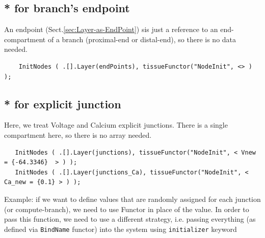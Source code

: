 \subsection{* for branch's endpoint}

An endpoint (Sect.\ref{sec:Layer-as-EndPoint}) sis just a reference to an
end-compartment of a branch (proximal-end or distal-end), so there is no data
needed.

\begin{verbatim}
	InitNodes ( .[].Layer(endPoints), tissueFunctor("NodeInit", <> ) );
\end{verbatim}


\subsection{* for explicit junction}

Here, we treat Voltage and Calcium explicit junctions. There is a single
compartment here, so there is no array needed.

{\tiny
\begin{verbatim}
   InitNodes ( .[].Layer(junctions), tissueFunctor("NodeInit", < Vnew = {-64.3346}  > ) ); 
   InitNodes ( .[].Layer(junctions_Ca), tissueFunctor("NodeInit", < Ca_new = {0.1} > ) );
\end{verbatim}
}

Example: if we want to define values that are randomly assigned for each junction (or compute-branch), we need to use Functor in place of the value. 
In order to pass this function, we need to use a different strategy, i.e. passing everything (as defined via \verb!BindName! functor) into the system using
\verb!initializer! keyword

